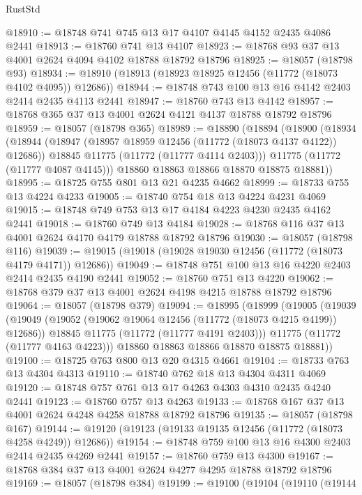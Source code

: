 \begin{lexlean}{RustStd}
\begin{coremodule}
@18910 := @18748 @741 @745 @13 @17 @4107 @4145 @4152 @2435 @4086 @2441
@18913 := @18760 @741 @13 @4107
@18923 := @18768 @93 @37 @13 @4001 @2624 @4094 @4102 @18788 @18792 @18796
@18925 := @18057 (@18798 @93)
@18934 := @18910 (@18913 (@18923 @18925 @12456 (@11772 (@18073 @4102 @4095)) @12686))
@18944 := @18748 @743 @100 @13 @16 @4142 @2403 @2414 @2435 @4113 @2441
@18947 := @18760 @743 @13 @4142
@18957 := @18768 @365 @37 @13 @4001 @2624 @4121 @4137 @18788 @18792 @18796
@18959 := @18057 (@18798 @365)
@18989 := @18890
    (@18894
      (@18900
        (@18934
          (@18944
            (@18947 (@18957 @18959 @12456 (@11772 (@18073 @4137 @4122)) @12686))
            @18845
            @11775
            (@11772 (@11777 @4114 @2403)))
          @11775
          (@11772 (@11777 @4087 @4145)))
        @18860
        @18863
        @18866
        @18870
        @18875
        @18881))
@18995 := @18725 @755 @801 @13 @21 @4235 @4662
@18999 := @18733 @755 @13 @4224 @4233
@19005 := @18740 @754 @18 @13 @4224 @4231 @4069
@19015 := @18748 @749 @753 @13 @17 @4184 @4223 @4230 @2435 @4162 @2441
@19018 := @18760 @749 @13 @4184
@19028 := @18768 @116 @37 @13 @4001 @2624 @4170 @4179 @18788 @18792 @18796
@19030 := @18057 (@18798 @116)
@19039 := @19015 (@19018 (@19028 @19030 @12456 (@11772 (@18073 @4179 @4171)) @12686))
@19049 := @18748 @751 @100 @13 @16 @4220 @2403 @2414 @2435 @4190 @2441
@19052 := @18760 @751 @13 @4220
@19062 := @18768 @379 @37 @13 @4001 @2624 @4198 @4215 @18788 @18792 @18796
@19064 := @18057 (@18798 @379)
@19094 := @18995
    (@18999
      (@19005
        (@19039
          (@19049
            (@19052 (@19062 @19064 @12456 (@11772 (@18073 @4215 @4199)) @12686))
            @18845
            @11775
            (@11772 (@11777 @4191 @2403)))
          @11775
          (@11772 (@11777 @4163 @4223)))
        @18860
        @18863
        @18866
        @18870
        @18875
        @18881))
@19100 := @18725 @763 @800 @13 @20 @4315 @4661
@19104 := @18733 @763 @13 @4304 @4313
@19110 := @18740 @762 @18 @13 @4304 @4311 @4069
@19120 := @18748 @757 @761 @13 @17 @4263 @4303 @4310 @2435 @4240 @2441
@19123 := @18760 @757 @13 @4263
@19133 := @18768 @167 @37 @13 @4001 @2624 @4248 @4258 @18788 @18792 @18796
@19135 := @18057 (@18798 @167)
@19144 := @19120 (@19123 (@19133 @19135 @12456 (@11772 (@18073 @4258 @4249)) @12686))
@19154 := @18748 @759 @100 @13 @16 @4300 @2403 @2414 @2435 @4269 @2441
@19157 := @18760 @759 @13 @4300
@19167 := @18768 @384 @37 @13 @4001 @2624 @4277 @4295 @18788 @18792 @18796
@19169 := @18057 (@18798 @384)
@19199 := @19100
    (@19104
      (@19110
        (@19144

\end{coremodule}
\end{lexlean}
